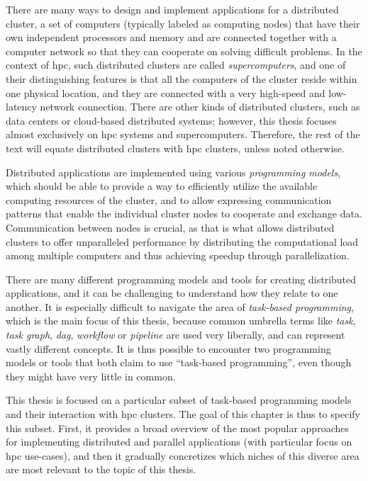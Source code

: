 There are many ways to design and implement applications for a distributed cluster, a set of
computers (typically labeled as computing nodes) that have their own independent processors and
memory and are connected together with a computer network so that they can cooperate on solving
difficult problems. In the context of \gls{hpc}, such distributed clusters are called
\emph{supercomputers}, and one of their distinguishing features is that all the computers of the
cluster reside within one physical location, and they are connected with a very high-speed and
low-latency network connection. There are other kinds of distributed clusters, such as data centers
or cloud-based distributed systems; however, this thesis focuses almost exclusively on
\gls{hpc} systems and supercomputers. Therefore, the rest of the text will equate
distributed clusters with \gls{hpc} clusters, unless noted otherwise.

Distributed applications are implemented using various \emph{programming models}, which should be able
to provide a way to efficiently utilize the available computing resources of the cluster, and to
allow expressing communication patterns that enable the individual cluster nodes to cooperate and
exchange data. Communication between nodes is crucial, as that is what allows distributed clusters
to offer unparalleled performance by distributing the computational load among multiple computers
and thus achieving speedup through parallelization.

There are many different programming models and tools for creating distributed applications, and it
can be challenging to understand how they relate to one another. It is especially difficult to
navigate the area of \emph{task-based programming}, which is the main focus of this thesis, because common
umbrella terms like \emph{task}, \emph{task graph}, \emph{\gls{dag}},
\emph{workflow} or \emph{pipeline} are used very liberally, and can represent vastly
different concepts. It is thus possible to encounter two programming models or tools that both
claim to use ``task-based programming'', even though they might have very little in common.

This thesis is focused on a particular subset of task-based programming models and their
interaction with \gls{hpc} clusters. The goal of this chapter is thus to specify this
subset. First, it provides a broad overview of the most popular approaches for implementing
distributed and parallel applications (with particular focus on \gls{hpc} use-cases),
and then it gradually concretizes which niches of this diverse area are most relevant to the topic
of this thesis.

